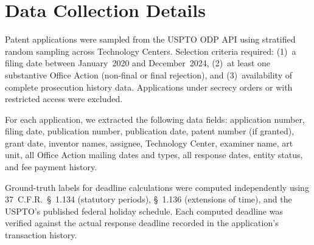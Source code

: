 \documentclass[11pt]{article}
\begin{document}
\section{Data Collection Details}
\label{app:data}

Patent applications were sampled from the USPTO ODP API using stratified random sampling across Technology Centers. Selection criteria required: (1)~a filing date between January~2020 and December~2024, (2)~at least one substantive Office Action (non-final or final rejection), and (3)~availability of complete prosecution history data. Applications under secrecy orders or with restricted access were excluded.

For each application, we extracted the following data fields: application number, filing date, publication number, publication date, patent number (if granted), grant date, inventor names, assignee, Technology Center, examiner name, art unit, all Office Action mailing dates and types, all response dates, entity status, and fee payment history.

Ground-truth labels for deadline calculations were computed independently using 37~C.F.R.~\S~1.134 (statutory periods), \S~1.136 (extensions of time), and the USPTO's published federal holiday schedule. Each computed deadline was verified against the actual response deadline recorded in the application's transaction history.
\end{document}
